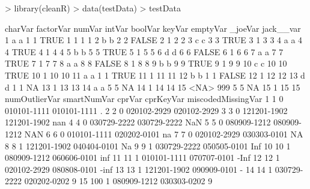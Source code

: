 \documentclass[article]{jss}
\begin{document}
\begin{Schunk}
\begin{Sinput}
> library(cleanR)
> data(testData)
> testData
\end{Sinput}
\begin{Soutput}
   charVar factorVar numVar intVar boolVar keyVar emptyVar _joeVar jack__var
1        a         a      1      1    TRUE      1        1       1         1
2        b         b      2      2   FALSE      2        1       2         2
3        c         c      3      3    TRUE      3        1       3         3
4        a         a      4      4    TRUE      4        1       4         4
5        b         b      5      5    TRUE      5        1       5         5
6        d         d      6      6   FALSE      6        1       6         6
7        a         a      7      7    TRUE      7        1       7         7
8        a         a      8      8   FALSE      8        1       8         8
9        b         b      9      9    TRUE      9        1       9         9
10       c         c     10     10    TRUE     10        1      10        10
11       a         a      1      1    TRUE     11        1      11        11
12       b         b      1      1   FALSE     12        1      12        12
13       d         d      1      1      NA     13        1      13        13
14       a         a      5      5      NA     14        1      14        14
15    <NA>       999      5      5      NA     15        1      15        15
   numOutlierVar smartNumVar      cprVar   cprKeyVar miscodedMissingVar
1              1           0 010101-1111 010101-1111                  .
2              2           0 020102-2929 020102-2929                   
3              3           0 121201-1902 121201-1902                nan
4              4           0 030729-2222 030729-2222                NaN
5              5           0 080909-1212 080909-1212                NAN
6              6           0 010101-1111 020202-0101                 na
7              7           0 020102-2929 030303-0101                 NA
8              8           1 121201-1902 040404-0101                 Na
9              9           1 030729-2222 050505-0101                Inf
10            10           1 080909-1212 060606-0101                inf
11            11           1 010101-1111 070707-0101               -Inf
12            12           1 020102-2929 080808-0101               -inf
13            13           1 121201-1902 090909-0101                  -
14            14           1 030729-2222 020202-0202                  9
15           100           1 080909-1212 030303-0202                  9
\end{Soutput}
\end{Schunk}
\end{document}
